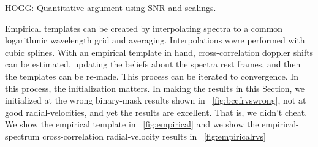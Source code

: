 \documentclass[modern]{aastex631}
\newcommand{\sectionname}{Section}
\newcommand{\figref}[1]{\figurename~\ref{#1}}
\begin{document}
HOGG: Quantitative argument using SNR and scalings.

Empirical templates can be created by interpolating spectra to a common logarithmic wavelength grid and averaging.
Interpolations wwre performed with cubic splines.
With an empirical template in hand, cross-correlation doppler shifts can be estimated, updating the beliefs about the spectra rest frames, and then the templates can be re-made.
This process can be iterated to convergence.
In this process, the initialization matters.
In making the results in this \sectionname, we initialized at the wrong binary-mask results shown in \figref{fig:bccfrvswrong}, not at good radial-velocities, and yet the results are excellent.
That is, we didn't cheat.
We show the empirical template in \figref{fig:empirical} and we show the
empirical-spectrum cross-correlation radial-velocity results in \figref{fig:empiricalrvs}
\end{document}
